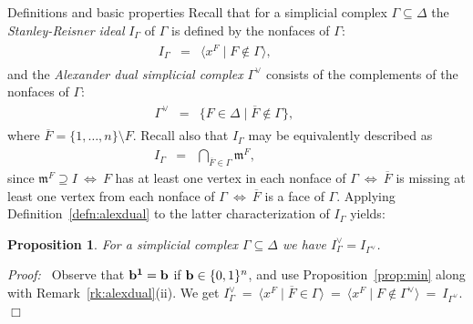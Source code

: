 \documentclass[12pt,leqno]{article}
\newtheorem{prop}[thm]{Proposition}
\def\<{{\langle}}
\def\>{{\rangle}}
\def\bb{{{\rm \bf b}}}
\def\mm{{\mathfrak m}}
\begin{document}
\begin{section}{Definitions and basic properties}
Recall that for a simplicial complex $\Gamma \subseteq \Delta$ the
\emph{Stanley-Reisner ideal} $I_\Gamma$ of $\Gamma$ is defined by the
nonfaces of $\Gamma$:
$$
\begin{array}{rcl}
\phantom{\ \<x^F \mid F \not\in \Gamma\>,}
\phantom{\Gamma^\vee\ }
\phantom{I_\Gamma\ }
	I_\Gamma
	& = &
	\<x^F \mid F \not\in \Gamma\>,
\phantom{\ \{\overline{F} \in \Delta \mid F \not \in \Gamma\}.}
\phantom{\bigcap_{F \in \Gamma} \mm^{\overline F}}
\end{array}
$$
and the \emph{Alexander dual simplicial complex} $\Gamma^\vee$ consists
of the complements of the nonfaces of $\Gamma$:
$$
\begin{array}{rcl}
\phantom{\ \<x^F \mid F \not\in \Gamma\>,}
\phantom{I_\Gamma\ }
\phantom{I_\Gamma\ }
	\Gamma^\vee
	& = &
	\{F \in \Delta \mid {\overline F} \not \in \Gamma\},
\phantom{\ \<x^F \mid F \not\in \Gamma\>,}
\phantom{\bigcap_{F \in \Gamma} \mm^{\overline F}}
\end{array}
$$
where ${\overline F} = \{1,\ldots,n\} \setminus F$.  Recall also that
$I_\Gamma$ may be equivalently described as
$$
\begin{array}{rcl}
\phantom{\ \<x^F \mid F \not\in \Gamma\>,}
\phantom{\Gamma^\vee\ }
\phantom{I_\Gamma\:}
	I_\Gamma
	& = &
	{\displaystyle \bigcap_{{\overline F} \in \Gamma} \mm^F},
\phantom{\ \<x^F \mid F \not\in \Gamma\>,}
\phantom{\ \{\overline{F} \in \Delta \mid F \not \in \Gamma\}.}
\end{array}
$$
since $\mm^F \supseteq I\ \Leftrightarrow\ F$ has at least one vertex in
each nonface of $\Gamma\ \Leftrightarrow\ {\overline F}$ is missing at
least one vertex from each nonface of $\Gamma\ \Leftrightarrow\
{\overline F}$ is a face of $\Gamma$.  Applying
Definition~\ref{defn:alexdual} to the latter characterization of
$I_\Gamma$ yields:

\begin{prop} \label{prop:X-dual}
For a simplicial complex $\Gamma \subseteq \Delta$ we have $I_\Gamma^\vee
= I_{\Gamma^\vee}$.
\end{prop}
{\it Proof:\ } Observe that $\bb^{\bf 1} = \bb$ if $\bb \in \{0,1\}^n$,
and use Proposition~\ref{prop:min} along with
Remark~\ref{rk:alexdual}(ii).  We get $I_\Gamma^\vee\ =\ \<x^F \mid
{\overline F} \in \Gamma\>\ =\ \<x^F \mid F \not\in \Gamma^\vee\>\ =\
I_{\Gamma^\vee}$.
%
\hfill
$\Box$


\end{section}
\end{document}
